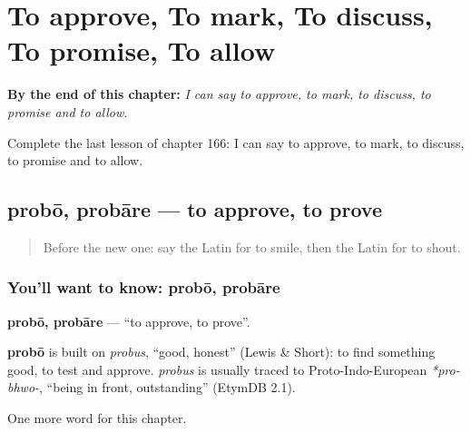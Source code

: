 
\chapter{To approve, To mark, To discuss, To promise, To allow}
\label{ch:la-to-approve-to-mark-to-discuss-to-promise-to-allow}

\begin{chapteropening}
\textbf{By the end of this chapter:} \emph{I can say to approve, to mark, to discuss, to promise and to allow.}

Complete the last lesson of chapter 166: I can say to approve, to mark, to discuss, to promise and to allow.
\end{chapteropening}

\section[probō, probāre]{probō, probāre — to approve, to prove}

\label{lesson:LA-C166-probo}



\begin{quote}
Before the new one: say the Latin for to smile, then the Latin for to shout.
\end{quote}

\subsection*{You'll want to know: probō, probāre}
\textbf{probō, probāre} — \textquotedblleft{}to approve, to prove\textquotedblright{}.

\begin{cousinweb}
\textbf{probō} is built on \emph{probus}, \textquotedblleft{}good, honest\textquotedblright{} (Lewis \& Short): to find something good, to test and approve. \emph{probus} is usually traced to Proto-Indo-European \emph{*pro-bhwo-}, \textquotedblleft{}being in front, outstanding\textquotedblright{} (EtymDB 2.1).
\end{cousinweb}

\begin{grammarlens}[title={What you've built}]
One more word for this chapter.
\end{grammarlens}

